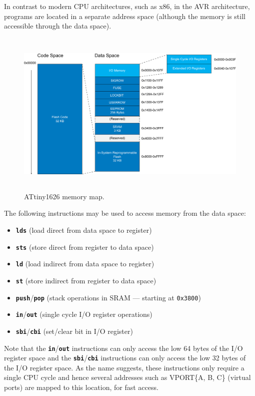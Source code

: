 \documentclass[a4paper]{report}
\newcommand{\keywordinline}[1]{\textcolor[rgb]{0.00,0.50,0.00}{\textbf{\texttt{#1}}}}
\begin{document}
In contrast to modern CPU architectures, such as x86, in the AVR architecture,
programs are located in a separate address space (although the memory is still accessible through the data space).
\begin{figure}[H]
    \centering
    \includegraphics[height = 8cm, keepaspectratio = true]{figures/memory_map.pdf}
    \caption{ATtiny1626 memory map.} %
\end{figure}
The following instructions may be used to access memory from the data space:
\begin{itemize}
    \item \keywordinline{lds} (load direct from data space to register)
    \item \keywordinline{sts} (store direct from register to data space)
    \item \keywordinline{ld} (load indirect from data space to register)
    \item \keywordinline{st} (store indirect from register to data space)
    \item \keywordinline{push}/\keywordinline{pop} (stack operations in SRAM --- starting at \texttt{0x3800}) %
    \item \keywordinline{in}/\keywordinline{out} (single cycle I/O register operations)
    \item \keywordinline{sbi}/\keywordinline{cbi} (set/clear bit in I/O register)
\end{itemize}
Note that the \keywordinline{in}/\keywordinline{out} instructions can
only access the low 64 bytes of the I/O register space and the \keywordinline{sbi}/\keywordinline{cbi}
instructions can only access the low 32 bytes of the I/O register space.
As the name suggests, these instructions only require a single CPU cycle and hence
several addresses such as VPORT\{A, B, C\} (virtual ports) are mapped to this location,
for fast access.
\end{document}
